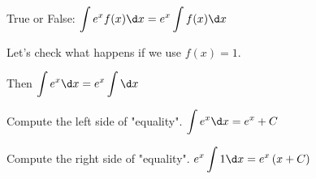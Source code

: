 \documentclass{ximera}
\author{Steven Gubkin}
\begin{document}
\begin{exercise}

True or False: $\displaystyle \int e^x f(x) \d x= e^x \int f(x) \d x$

\begin{hint}
	Let's check what happens if we use $f(x)=1$. 
	
	Then $\displaystyle \int e^x  \d x= e^x \int \d x$
	
	Compute the left  side of "equality".
	$\displaystyle \int e^x \d x=e^x+C$
	
	Compute the right  side of "equality".
	$\displaystyle e^x \int1 \d x=e^x\left(x+C\right)$
\end{hint}

	\begin{multipleChoice}	
	\end{multipleChoice}

\end{exercise}
\end{document}
